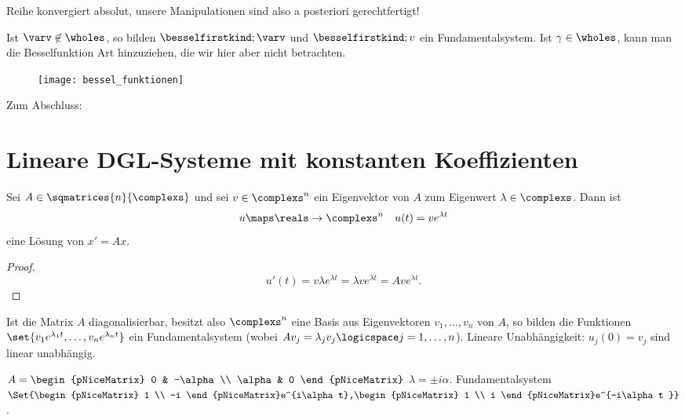 Reihe konvergiert absolut, unsere Manipulationen sind also a posteriori gerechtfertigt!

Ist \( \varv\not\in \wholes \), so bilden \( \besselfirstkind;{\varv} \) und \( \besselfirstkind;{v} \) ein Fundamentalsystem. Ist \( \gamma\in \wholes \), kann man \zb die Besselfunktion  Art hinzuziehen, die wir hier aber nicht betrachten.
\begin{figure}[H]
  \centering
  \texttt{[image: bessel\_funktionen]}
  \label{fig:bessel_funktionen}
\end{figure}
Zum Abschluss:
\section*{Lineare DGL-Systeme mit konstanten Koeffizienten}
\begin{lemma}\label{eigenwert_von_konstanter_matrix_dgl_liefert_exp_loesung}
  Sei \( A\in \sqmatrices{n}{\complexs} \) und sei \( v\in \complexs^n \) ein Eigenvektor von \( A \) zum Eigenwert \( \lambda\in \complexs \). Dann ist
  \begin{equation*}
    u\maps \reals\to \complexs^n\quad u(t)=ve^{\lambda t}
  \end{equation*}
  eine Lösung von \( x'=Ax \).
\end{lemma}
\begin{proof}
  \begin{equation*}
    u'(t)=v\lambda e^{\lambda t}=\lambda v e^{\lambda t}=A v e^{\lambda t}.
  \end{equation*}
  
\end{proof}
\begin{folgerung*}
  Ist die Matrix \( A \) diagonalisierbar, besitzt also \( \complexs^n \) eine Basis aus Eigenvektoren \( v_1,\dotsc,v_n \) von \( A \), so bilden die Funktionen \( \set{v_1 e^{\lambda_1 t},\dotsc, v_n e^{\lambda_n t}} \) ein Fundamentalsystem (wobei \( Av_j=\lambda_j v_j \logicspace j=1,\dotsc,n\)). Lineare Unabhängigkeit: \( u_j(0)=v_j \) sind linear unabhängig.
\end{folgerung*}
\begin{beispiel*}
  \( A=\begin{pNiceMatrix} 0 & -\alpha \\ \alpha & 0 \end{pNiceMatrix} \) \timplies \( \lambda=\pm i\alpha \). Fundamentalsystem \( \Set{\begin{pNiceMatrix} 1 \\ -i \end{pNiceMatrix}e^{i\alpha t},\begin{pNiceMatrix} 1 \\ i \end{pNiceMatrix}e^{-i\alpha t }} \).
\end{beispiel*}
